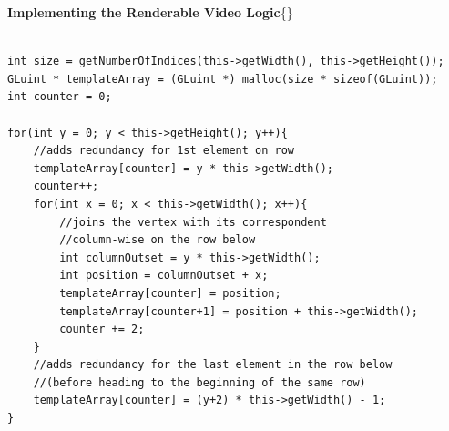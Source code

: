 \documentclass[12pt, a4paper]{report}
\newenvironment{loggentry}[2]%
{\noindent\textbf{#2}\newline\{\marginnote{#1}\}\newline\\}{\vspace{1.0cm}}
\begin{document}
\begin{loggentry}{06-06-2019}{Implementing the Renderable Video Logic}
\begin{itemize}
\begin{itemize}
								\begin{verbatim}

int size = getNumberOfIndices(this->getWidth(), this->getHeight());
GLuint * templateArray = (GLuint *) malloc(size * sizeof(GLuint));
int counter = 0;

for(int y = 0; y < this->getHeight(); y++){
	//adds redundancy for 1st element on row
	templateArray[counter] = y * this->getWidth();
	counter++;
	for(int x = 0; x < this->getWidth(); x++){
		//joins the vertex with its correspondent
		//column-wise on the row below
		int columnOutset = y * this->getWidth();
		int position = columnOutset + x;
		templateArray[counter] = position; 
		templateArray[counter+1] = position + this->getWidth();
		counter += 2;
	}
	//adds redundancy for the last element in the row below
	//(before heading to the beginning of the same row)
	templateArray[counter] = (y+2) * this->getWidth() - 1;
}

								\end{verbatim}
	
					\end{itemize}
		\end{itemize}
		
	\end{loggentry}
\end{document}
